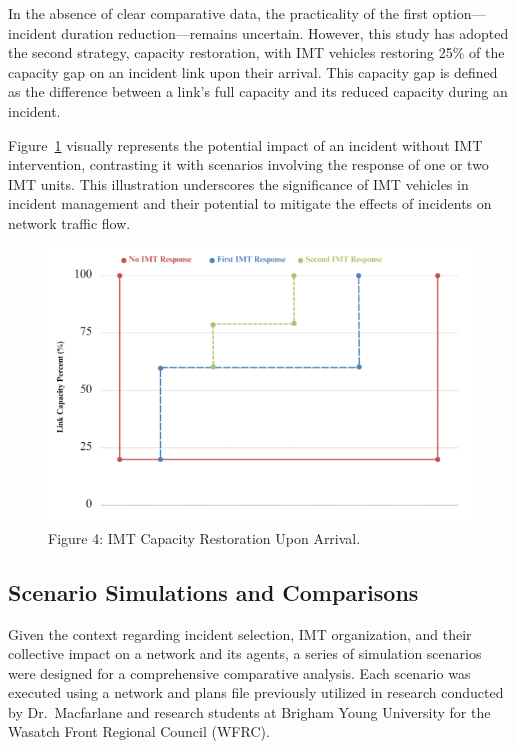\documentclass[
  letterpaper,
  authoryear]{elsarticle}
\begin{document}
In the absence of clear comparative data, the practicality of the first
option---incident duration reduction---remains uncertain. However, this
study has adopted the second strategy, capacity restoration, with IMT
vehicles restoring 25\% of the capacity gap on an incident link upon
their arrival. This capacity gap is defined as the difference between a
link's full capacity and its reduced capacity during an incident.

Figure~\ref{fig-Cap_Restore} visually represents the potential impact of
an incident without IMT intervention, contrasting it with scenarios
involving the response of one or two IMT units. This illustration
underscores the significance of IMT vehicles in incident management and
their potential to mitigate the effects of incidents on network traffic
flow.

\begin{figure}

{\centering \includegraphics{figures/cap_restore.png}

}

\caption{\label{fig-Cap_Restore}Figure 4: IMT Capacity Restoration Upon
Arrival.}

\end{figure}

\hypertarget{scenario-simulations-and-comparisons}{%
\subsection{Scenario Simulations and
Comparisons}\label{scenario-simulations-and-comparisons}}

Given the context regarding incident selection, IMT organization, and
their collective impact on a network and its agents, a series of
simulation scenarios were designed for a comprehensive comparative
analysis. Each scenario was executed using a network and plans file
previously utilized in research conducted by Dr.~Macfarlane and research
students at Brigham Young University for the Wasatch Front Regional
Council (WFRC).
\end{document}
